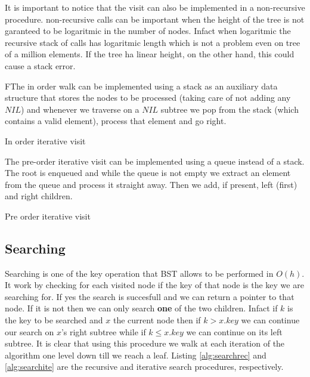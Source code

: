 It is important to notice that the visit can also be implemented in a non-recursive procedure. non-recursive calls can be important when the height of the tree is not garanteed to be logaritmic in the number of nodes. Infact when logaritmic the recursive stack of calls has logaritmic length which is not a problem even on tree of a million elements. If the tree ha linear height, on the other hand, this could cause a stack error.

FThe in order walk can be implemented using a stack as an auxiliary data structure that stores the nodes to be processed (taking care of not adding any $NIL$) and whenever we traverse on a $NIL$ subtree we pop from the stack (which contains a valid element), process that element and go right.

\begin{algorithm}
\caption{In order iterative visit }\label{alg:pst}
\end{algorithm}

The pre-order iterative visit can be implemented using a queue instead of a stack. The root is enqueued and while the queue is not empty we extract an element from the queue and process it straight away. Then we add, if present, left (first) and right children.

\begin{algorithm}
\caption{Pre order iterative visit }\label{alg:pre_iter}
\end{algorithm}


\subsection{Searching}
Searching is one of the key operation that BST allows to be performed in $O(h)$. It work by checking for each visited node if the key of that node is the key we are searching for. If yes the search is succesfull and we can return a pointer to that node. If it is not then we can only search \textbf{one} of the two children. Infact if $k$ is the key to be searched and $x$ the current node then if $k > x.key $ we can continue our search on $x$'s right subtree while if $k \leq x.key $ we can continue on its left subtree. It is clear that using this procedure we walk at each iteration of the algorithm one level down till we reach a leaf. Listing \ref{alg:searchrec} and \ref{alg:searchite} are the recursive and iterative search procedures, respectively.

